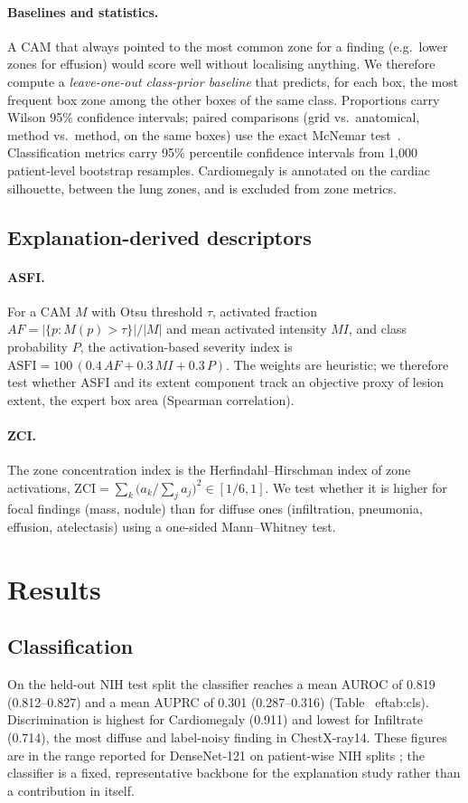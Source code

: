 \documentclass[pdflatex,sn-mathphys-num]{sn-jnl}
\begin{document}
\paragraph{Baselines and statistics.} A CAM that always pointed to the most common zone for a finding (e.g.\ lower zones for effusion) would score well without localising anything. We therefore compute a \emph{leave-one-out class-prior baseline} that predicts, for each box, the most frequent box zone among the other boxes of the same class. Proportions carry Wilson 95\% confidence intervals; paired comparisons (grid vs.\ anatomical, method vs.\ method, on the same boxes) use the exact McNemar test~\cite{mcnemar1947}. Classification metrics carry 95\% percentile confidence intervals from 1,000 patient-level bootstrap resamples. Cardiomegaly is annotated on the cardiac silhouette, between the lung zones, and is excluded from zone metrics.

\subsection{Explanation-derived descriptors}
\paragraph{ASFI.} For a CAM $M$ with Otsu threshold $\tau$, activated fraction $AF=|\{p:M(p)>\tau\}|/|M|$ and mean activated intensity $MI$, and class probability $P$, the activation-based severity index is $\mathrm{ASFI}=100\,(0.4\,AF+0.3\,MI+0.3\,P)$. The weights are heuristic; we therefore test whether ASFI and its extent component track an objective proxy of lesion extent, the expert box area (Spearman correlation).
\paragraph{ZCI.} The zone concentration index is the Herfindahl--Hirschman index of zone activations, $\mathrm{ZCI}=\sum_k\big(a_k/\sum_j a_j\big)^2\in[1/6,1]$. We test whether it is higher for focal findings (mass, nodule) than for diffuse ones (infiltration, pneumonia, effusion, atelectasis) using a one-sided Mann--Whitney test.

\section{Results}\label{sec:results}

\subsection{Classification}
On the held-out NIH test split the classifier reaches a mean AUROC of 0.819 (0.812--0.827) and a mean AUPRC of 0.301 (0.287--0.316) (Table~
ef{tab:cls}). Discrimination is highest for Cardiomegaly (0.911) and lowest for Infiltrate (0.714), the most diffuse and label-noisy finding in ChestX-ray14. These figures are in the range reported for DenseNet-121 on patient-wise NIH splits \cite{rajpurkar2017chexnet,wang2017chestxray8}; the classifier is a fixed, representative backbone for the explanation study rather than a contribution in itself.
\end{document}
